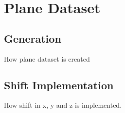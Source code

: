 \chapter{Plane Dataset}
\section{Generation}

How plane dataset is created

\section{Shift Implementation}

How shift in x, y and z is implemented.


